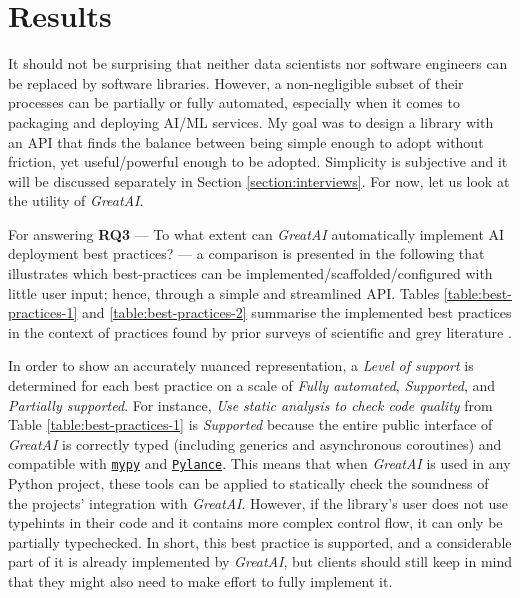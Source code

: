 \chapter{Results} \label{chapter:interviews}

It should not be surprising that neither data scientists nor software engineers can be replaced by software libraries. However, a non-negligible subset of their processes can be partially or fully automated, especially when it comes to packaging and deploying AI/ML services. My goal was to design a library with an API that finds the balance between being simple enough to adopt without friction, yet useful/powerful enough to be adopted. Simplicity is subjective and it will be discussed separately in Section \ref{section:interviews}. For now, let us look at the utility of \textit{GreatAI}.

For answering \textbf{RQ3} --- To what extent can \textit{GreatAI} automatically implement AI deployment best practices? --- a comparison is presented in the following that illustrates which best-practices can be implemented/scaffolded/configured with little user input; hence, through a simple and streamlined API. Tables \ref{table:best-practices-1} and \ref{table:best-practices-2} summarise the implemented best practices in the context of practices found by prior surveys of scientific and grey literature \cite{serban2020adoption,serban2021practices,john2020architecting}.

In order to show an accurately nuanced representation, a \textit{Level of support} is determined for each best practice on a scale of \textit{Fully automated}, \textit{Supported}, and \textit{Partially supported}. For instance, \textit{Use static analysis to check code quality} from Table \ref{table:best-practices-1} is \textit{Supported} because the entire public interface of \textit{GreatAI} is correctly typed (including generics and asynchronous coroutines) and compatible with \href{https://mypy.readthedocs.io/en/stable/index.html#}{\texttt{mypy}} and \href{https://marketplace.visualstudio.com/items?itemName=ms-python.vscode-pylance}{\texttt{Pylance}}. This means that when \textit{GreatAI} is used in any Python project, these tools can be applied to statically check the soundness of the projects' integration with \textit{GreatAI}. However, if the library's user does not use typehints in their code and it contains more complex control flow, it can only be partially typechecked. In short, this best practice is supported, and a considerable part of it is already implemented by \textit{GreatAI}, but clients should still keep in mind that they might also need to make effort to fully implement it.

